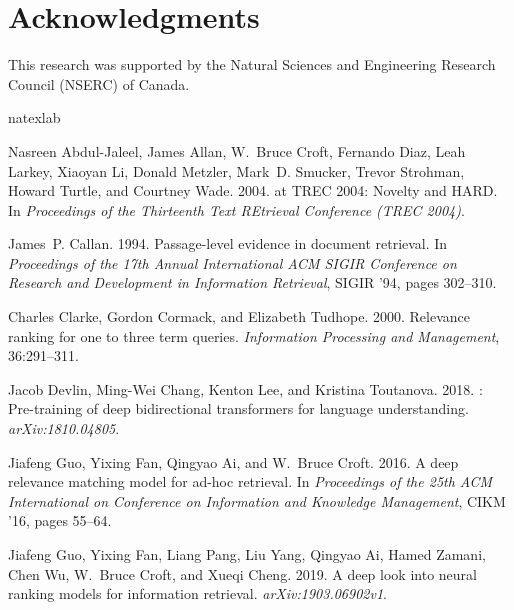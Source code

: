 \documentclass[11pt,a4paper]{article}
\begin{document}
\section*{Acknowledgments}

This research was supported by the Natural Sciences and Engineering Research Council (NSERC) of Canada. 



\begin{thebibliography}{26}
\expandafter\ifx\csname natexlab\endcsname\relax\def\natexlab#1{#1}\fi

Nasreen Abdul-Jaleel, James Allan, W.~Bruce Croft, Fernando Diaz, Leah Larkey,
  Xiaoyan Li, Donald Metzler, Mark~D. Smucker, Trevor Strohman, Howard Turtle,
  and Courtney Wade. 2004.
 at {TREC} 2004: {Novelty} and {HARD}.
\newblock In \emph{Proceedings of the Thirteenth Text REtrieval Conference
  (TREC 2004)}.

James~P. Callan. 1994.
\newblock Passage-level evidence in document retrieval.
\newblock In \emph{Proceedings of the 17th Annual International ACM SIGIR
  Conference on Research and Development in Information Retrieval}, SIGIR '94,
  pages 302--310.

Charles Clarke, Gordon Cormack, and Elizabeth Tudhope. 2000.
\newblock Relevance ranking for one to three term queries.
\newblock \emph{Information Processing and Management}, 36:291--311.

Jacob Devlin, Ming-Wei Chang, Kenton Lee, and Kristina Toutanova. 2018.
: Pre-training of deep bidirectional transformers for language
  understanding.
\newblock \emph{arXiv:1810.04805}.

Jiafeng Guo, Yixing Fan, Qingyao Ai, and W.~Bruce Croft. 2016.
\newblock A deep relevance matching model for ad-hoc retrieval.
\newblock In \emph{Proceedings of the 25th ACM International on Conference on
  Information and Knowledge Management}, CIKM '16, pages 55--64.

Jiafeng Guo, Yixing Fan, Liang Pang, Liu Yang, Qingyao Ai, Hamed Zamani, Chen
  Wu, W.~Bruce Croft, and Xueqi Cheng. 2019.
\newblock A deep look into neural ranking models for information retrieval.
\newblock \emph{arXiv:1903.06902v1}.


\end{thebibliography}
\end{document}
